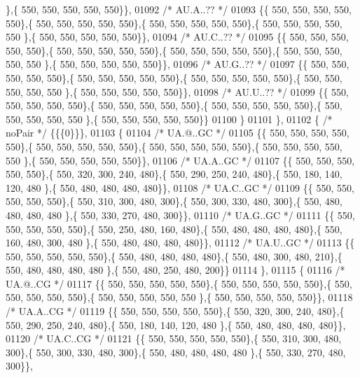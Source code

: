 \begin{DoxyCode}
      \},\{ 550, 550, 550, 550, 550\}\},
01092 \textcolor{comment}{/* AU.A..?? */}
01093 \{\{ 550, 550, 550, 550, 550\},\{ 550, 550, 550, 550, 550\},\{ 550, 550, 550, 550, 550\},\{ 550, 550, 550, 550, 550
      \},\{ 550, 550, 550, 550, 550\}\},
01094 \textcolor{comment}{/* AU.C..?? */}
01095 \{\{ 550, 550, 550, 550, 550\},\{ 550, 550, 550, 550, 550\},\{ 550, 550, 550, 550, 550\},\{ 550, 550, 550, 550, 550
      \},\{ 550, 550, 550, 550, 550\}\},
01096 \textcolor{comment}{/* AU.G..?? */}
01097 \{\{ 550, 550, 550, 550, 550\},\{ 550, 550, 550, 550, 550\},\{ 550, 550, 550, 550, 550\},\{ 550, 550, 550, 550, 550
      \},\{ 550, 550, 550, 550, 550\}\},
01098 \textcolor{comment}{/* AU.U..?? */}
01099 \{\{ 550, 550, 550, 550, 550\},\{ 550, 550, 550, 550, 550\},\{ 550, 550, 550, 550, 550\},\{ 550, 550, 550, 550, 550
      \},\{ 550, 550, 550, 550, 550\}\}
01100 \}
01101 \},
01102 \{ \textcolor{comment}{/* noPair */} \{\{\{0\}\}\},
01103 \{
01104 \textcolor{comment}{/* UA.@..GC */}
01105 \{\{ 550, 550, 550, 550, 550\},\{ 550, 550, 550, 550, 550\},\{ 550, 550, 550, 550, 550\},\{ 550, 550, 550, 550, 550
      \},\{ 550, 550, 550, 550, 550\}\},
01106 \textcolor{comment}{/* UA.A..GC */}
01107 \{\{ 550, 550, 550, 550, 550\},\{ 550, 320, 300, 240, 480\},\{ 550, 290, 250, 240, 480\},\{ 550, 180, 140, 120, 480
      \},\{ 550, 480, 480, 480, 480\}\},
01108 \textcolor{comment}{/* UA.C..GC */}
01109 \{\{ 550, 550, 550, 550, 550\},\{ 550, 310, 300, 480, 300\},\{ 550, 300, 330, 480, 300\},\{ 550, 480, 480, 480, 480
      \},\{ 550, 330, 270, 480, 300\}\},
01110 \textcolor{comment}{/* UA.G..GC */}
01111 \{\{ 550, 550, 550, 550, 550\},\{ 550, 250, 480, 160, 480\},\{ 550, 480, 480, 480, 480\},\{ 550, 160, 480, 300, 480
      \},\{ 550, 480, 480, 480, 480\}\},
01112 \textcolor{comment}{/* UA.U..GC */}
01113 \{\{ 550, 550, 550, 550, 550\},\{ 550, 480, 480, 480, 480\},\{ 550, 480, 300, 480, 210\},\{ 550, 480, 480, 480, 480
      \},\{ 550, 480, 250, 480, 200\}\}
01114 \},
01115 \{
01116 \textcolor{comment}{/* UA.@..CG */}
01117 \{\{ 550, 550, 550, 550, 550\},\{ 550, 550, 550, 550, 550\},\{ 550, 550, 550, 550, 550\},\{ 550, 550, 550, 550, 550
      \},\{ 550, 550, 550, 550, 550\}\},
01118 \textcolor{comment}{/* UA.A..CG */}
01119 \{\{ 550, 550, 550, 550, 550\},\{ 550, 320, 300, 240, 480\},\{ 550, 290, 250, 240, 480\},\{ 550, 180, 140, 120, 480
      \},\{ 550, 480, 480, 480, 480\}\},
01120 \textcolor{comment}{/* UA.C..CG */}
01121 \{\{ 550, 550, 550, 550, 550\},\{ 550, 310, 300, 480, 300\},\{ 550, 300, 330, 480, 300\},\{ 550, 480, 480, 480, 480
      \},\{ 550, 330, 270, 480, 300\}\},

\end{DoxyCode}
